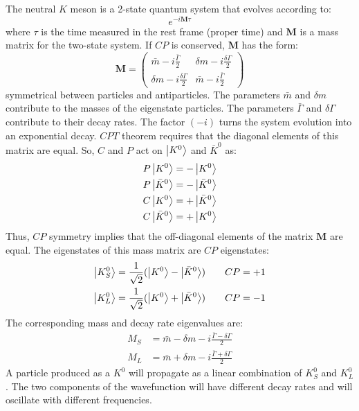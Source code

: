 \documentclass[../../main/main.tex]{subfiles}
\begin{document}
The neutral \( K \) meson is a 2-state quantum system that evolves according to:
\begin{equation}
	e^{-i \mathbf{M} \tau}
	\label{eq:}
\end{equation}
where \( \tau \) is the time measured in the rest frame (proper time) and \( \mathbf{M} \) is a mass matrix for the two-state system. If \( CP \) is conserved, \( \mathbf{M} \) has the form:
\begin{equation}
	\mathbf{M}
	=
	\begin{pmatrix}
		\bar{m} - i \frac{\bar{\Gamma}}{2}	&	\delta m - i \frac{\delta \Gamma}{2}	\\
		\delta m - i \frac{\delta \Gamma}{2}	&	\bar{m} - i \frac{\bar{\Gamma}}{2}
	\end{pmatrix}
	\label{eq:}
\end{equation}
symmetrical between particles and antiparticles. The parameters \( \bar{m} \) and \( \delta m \) contribute to the masses of the eigenstate particles. The parameters \( \bar{\Gamma} \) and \( \delta \Gamma \) contribute to their decay rates. The factor \( (-i) \) turns the system evolution into an exponential decay. \( CPT \) theorem requires that the diagonal elements of this matrix are equal. So, \( C \) and \( P \) act on \( \ket{K^0} \) and \( \bar{K}^0 \) as:
\begin{align}
	P \ket{K^0}			&= - \ket{K^0}			\\
	P \ket{\bar{K}^0}	&= - \ket{\bar{K}^0}	\\
	C \ket{K^0}			&= + \ket{\bar{K}^0}	\\
	C \ket{\bar{K}^0}	&= + \ket{K^0}
\end{align}
Thus, \( CP \) symmetry implies that the off-diagonal elements of the matrix \( \mathbf{M} \) are equal. The eigenstates of this mass matrix are \( CP \) eigenstates:
\begin{align}
	\ket{K^0_S}	&= \frac{1}{\sqrt{2}} ( \ket{K^0} - \ket{\bar{K}^0} )	\qquad CP=+1	\\
	\ket{K^0_L}	&= \frac{1}{\sqrt{2}} ( \ket{K^0} + \ket{\bar{K}^0} )	\qquad CP=-1
\end{align}
The corresponding mass and decay rate eigenvalues are:
\begin{align}
	M_S	&= \bar{m} - \delta m - i \frac{\bar{\Gamma} - \delta \Gamma}{2}	\\
	M_L	&= \bar{m} + \delta m - i \frac{\bar{\Gamma} + \delta \Gamma}{2}
\end{align}
A particle produced as a \( K^0 \) will propagate as a linear combination of \( K^0_S \) and \( K^0_L \). The two components of the wavefunction will have different decay rates and will oscillate with different frequencies.
\end{document}

